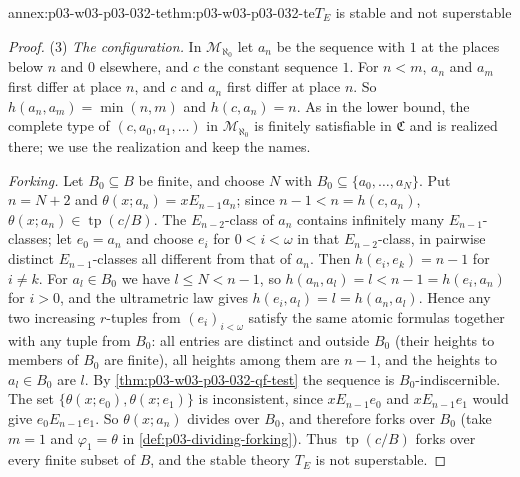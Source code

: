\begin{annexitem}{annex:p03-w03-p03-032-te}{thm:p03-w03-p03-032-te}{\(T_E\) is stable and not superstable}
\begin{proof}
(3) \emph{The configuration.}  In \(\mathcal M_{\aleph_0}\) let \(a_n\) be
the sequence with \(1\) at the places below \(n\) and \(0\) elsewhere, and
\(c\) the constant sequence \(1\).  For \(n<m\), \(a_n\) and \(a_m\) first
differ at place \(n\), and \(c\) and \(a_n\) first differ at place \(n\).  So
\(h(a_n,a_m)=\min(n,m)\) and \(h(c,a_n)=n\).  As in the lower bound, the
complete type of \((c,a_0,a_1,\ldots)\) in \(\mathcal M_{\aleph_0}\) is
finitely satisfiable in \(\mathfrak C\) and is realized there; we use the
realization and keep the names.

\emph{Forking.}  Let \(B_0\subseteq B\) be finite, and choose \(N\) with
\(B_0\subseteq\{a_0,\ldots,a_N\}\).  Put \(n=N+2\) and
\(\theta(x;a_n)=x\mathrel{E_{n-1}}a_n\); since \(n-1<n=h(c,a_n)\),
\(\theta(x;a_n)\in\operatorname{tp}(c/B)\).  The \(E_{n-2}\)-class of
\(a_n\) contains infinitely many \(E_{n-1}\)-classes; let \(e_0=a_n\) and
choose \(e_i\) for \(0<i<\omega\) in that \(E_{n-2}\)-class, in pairwise
distinct \(E_{n-1}\)-classes all different from that of \(a_n\).  Then
\(h(e_i,e_k)=n-1\) for \(i\neq k\).  For \(a_l\in B_0\) we have \(l\leq N<n-1\),
so \(h(a_n,a_l)=l<n-1=h(e_i,a_n)\) for \(i>0\), and the ultrametric law gives
\(h(e_i,a_l)=l=h(a_n,a_l)\).  Hence any two increasing \(r\)-tuples from
\((e_i)_{i<\omega}\) satisfy the same atomic formulas together with any tuple
from \(B_0\): all entries are distinct and outside \(B_0\) (their heights to
members of \(B_0\) are finite), all heights among them are \(n-1\), and the
heights to \(a_l\in B_0\) are \(l\).  By
\cref{thm:p03-w03-p03-032-qf-test} the sequence is \(B_0\)-indiscernible.
The set \(\{\theta(x;e_0),\theta(x;e_1)\}\) is inconsistent, since
\(x\mathrel{E_{n-1}}e_0\) and \(x\mathrel{E_{n-1}}e_1\) would give
\(e_0\mathrel{E_{n-1}}e_1\).  So \(\theta(x;a_n)\) divides over \(B_0\), and
therefore forks over \(B_0\) (take \(m=1\) and \(\varphi_1=\theta\) in
\cref{def:p03-dividing-forking}).  Thus \(\operatorname{tp}(c/B)\) forks over
every finite subset of \(B\), and the stable theory \(T_E\) is not
superstable.
\end{proof}
\end{annexitem}
